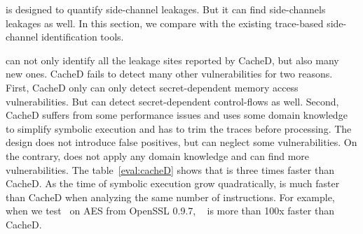 \tool{} is designed to quantify side-channel leakages. But it can find
side-channels leakages as well. In this section, we compare \tool{} with the
existing trace-based side-channel identification tools.

\tool{} can not only identify all the leakage sites reported by CacheD, but also
many new ones. CacheD fails to detect many other vulnerabilities for two
reasons. First, CacheD only can only detect secret-dependent memory access
vulnerabilities. But \tool{} can detect secret-dependent control-flows as well.
Second, CacheD suffers from some performance issues and uses some domain
knowledge to simplify symbolic execution and has to trim the traces before
processing. The design does not introduce false positives, but can neglect some
vulnerabilities. On the contrary, \tool{} does not apply any domain knowledge
and can find more vulnerabilities. The table~\ref{eval:cacheD} shows that
\tool{} is three times faster than CacheD. As the time of symbolic execution
grow quadratically, \tool{} is much faster than CacheD when analyzing the same
number of instructions. For example, when we test~\tool{} on AES from OpenSSL
0.9.7, ~\tool{} is more than 100x faster than CacheD.


